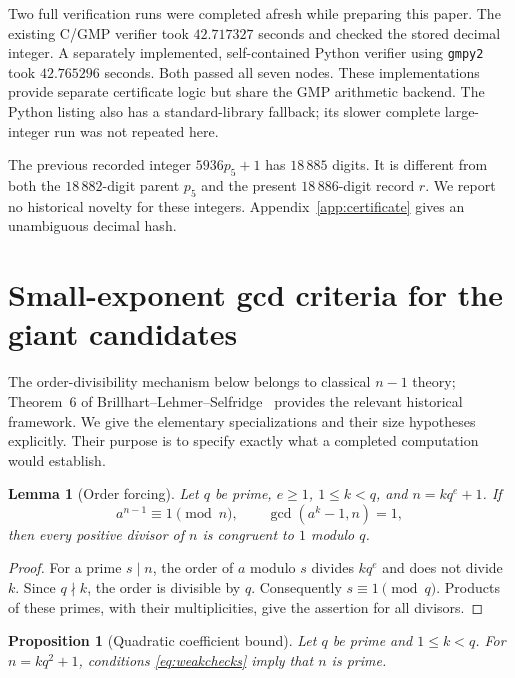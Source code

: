 \documentclass[11pt,a4paper]{article}
\newtheorem{proposition}[theorem]{Proposition}
\newtheorem{lemma}[theorem]{Lemma}
\theoremstyle{definition}
\begin{document}
Two full verification runs were completed afresh while preparing this
paper. The existing C/GMP verifier took $42.717327$ seconds and checked the
stored decimal integer. A separately implemented, self-contained Python
verifier using \texttt{gmpy2} took $42.765296$ seconds. Both passed all seven
nodes. These implementations provide separate certificate logic but share
the GMP arithmetic backend. The Python listing also has a standard-library
fallback; its slower complete large-integer run was not repeated here.

The previous recorded integer $5936p_5+1$ has $18\,885$ digits. It is
different from both the $18\,882$-digit parent $p_5$ and the present
$18\,886$-digit record $r$. We report no historical novelty for these
integers. Appendix~\ref{app:certificate} gives an unambiguous decimal hash.

\section{Small-exponent gcd criteria for the giant candidates}
\label{sec:criteria}

The order-divisibility mechanism below belongs to classical $n-1$ theory;
Theorem~6 of Brillhart--Lehmer--Selfridge~\cite{bls} provides the relevant
historical framework. We give the elementary specializations and their
size hypotheses explicitly. Their purpose is to specify exactly what a
completed computation would establish.

\begin{lemma}[Order forcing]\label{lem:order}
Let $q$ be prime, $e\ge1$, $1\le k<q$, and $n=kq^e+1$. If
\begin{equation}\label{eq:weakchecks}
 a^{n-1}\equiv1\pmod n,
 \qquad \gcd(a^k-1,n)=1,
\end{equation}
then every positive divisor of $n$ is congruent to $1$ modulo $q$.
\end{lemma}

\begin{proof}
For a prime $s\mid n$, the order of $a$ modulo $s$ divides $kq^e$ and
does not divide $k$. Since $q\nmid k$, the order is divisible by $q$.
Consequently $s\equiv1\pmod q$. Products of these primes, with their
multiplicities, give the assertion for all divisors.
\end{proof}

\begin{proposition}[Quadratic coefficient bound]\label{prop:quadcriterion}
Let $q$ be prime and $1\le k<q$. For $n=kq^2+1$, conditions
\eqref{eq:weakchecks} imply that $n$ is prime.
\end{proposition}
\end{document}

